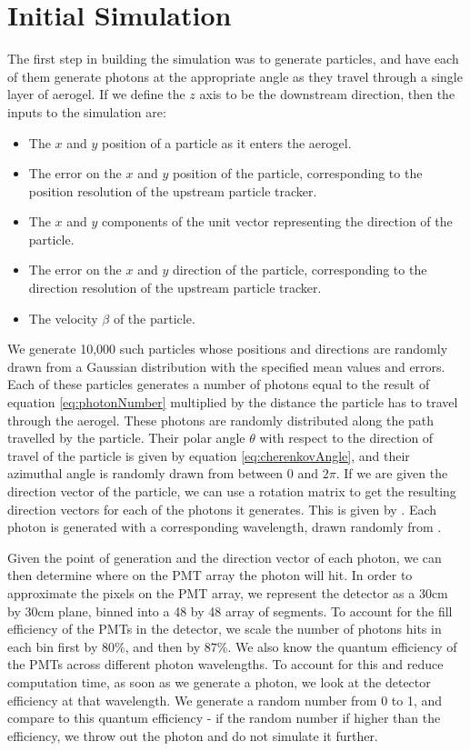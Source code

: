 \section{Initial Simulation}
\label{sec:experiment}
The first step in building the simulation was to generate particles, and have each of them generate photons at the appropriate angle as they travel through a single layer of aerogel. If we define the $z$ axis to be the downstream direction, then the inputs to the simulation are:
\begin{itemize}
\item The $x$ and $y$ position of a particle as it enters the aerogel.
\item The error on the $x$ and $y$ position of the particle, corresponding to the position resolution of the upstream particle tracker.
\item The $x$ and $y$ components of the unit vector representing the direction of the particle.
\item The error on the $x$ and $y$ direction of the particle, corresponding to the direction resolution of the upstream particle tracker.
\item The velocity $\beta$ of the particle.
\end{itemize} 
We generate 10,000 such particles whose positions and directions are randomly drawn from a Gaussian distribution with the specified mean values and errors. 
Each of these particles generates a number of photons equal to the result of equation \ref{eq:photonNumber} multiplied by the distance the particle has to travel through the aerogel.
These photons are randomly distributed along the path travelled by the particle.
Their polar angle $\theta$ with respect to the direction of travel of the particle is given by equation \ref{eq:cherenkovAngle}, and their azimuthal angle is randomly drawn from between 0 and $2\pi$. 
If we are given the direction vector of the particle, we can use a rotation matrix to get the resulting direction vectors for each of the photons it generates.
This is given by .
Each photon is generated with a corresponding wavelength, drawn randomly from . 

Given the point of generation and the direction vector of each photon, we can then determine where on the PMT array the photon will hit.
In order to approximate the pixels on the PMT array, we represent the detector as a 30cm by 30cm plane, binned into a 48 by 48 array of segments.
To account for the fill efficiency of the PMTs in the detector, we scale the number of photons hits in each bin first by $80\%$, and then by $87\%$.
We also know the quantum efficiency of the PMTs across different photon wavelengths.
To account for this and reduce computation time, as soon as we generate a photon, we look at the detector efficiency at that wavelength. 
We generate a random number from 0 to 1, and compare to this quantum efficiency - if the random number if higher than the efficiency, we throw out the photon and do not simulate it further.

